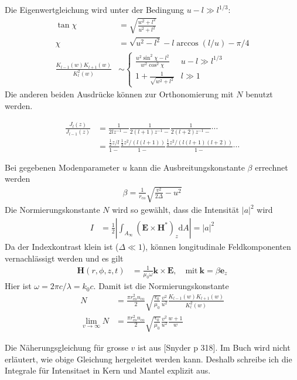 \documentclass{article}
\newcommand{\vect}[1]{\mathbf{#1}}
\def\k{\vect k}
\def\e{\vect e}
\def\E{\vect E}
\def\H{\vect H}
\def\({\left(}
\def\){\right)}
\newcommand{\nco}{n_\textrm{co}}
\newcommand{\rco}{r_\textrm{co}}
\begin{document}
Die Eigenwertgleichung wird unter der Bedingung $u-l\gg l^{1/3}$:
\begin{align}
  \tan\chi &= \sqrt{\frac{w^2+l^2}{u^2+l^2}}\\
  \chi &= \sqrt{u^2-l^2}-l\arccos(l/u)-\pi/4\\
  \frac{K_{l-1}(w)K_{l+1}(w)}{K_l^2(w)} &\sim \begin{cases}
    \frac{u^2 \sin^2\chi - l^2}{w^2 \cos^2\chi}&  u-l\gg l^{1/3}\\
   1+\frac{1}{\sqrt{w^2+l^2}} & l\gg 1
\end{cases}
\end{align}
Die anderen beiden Ausdr\"ucke k\"onnen zur Orthonomierung mit $N$
benutzt werden.

\begin{align}
  \frac{J_l(z)}{J_{l-1}(z)} &= \frac{1}{2lz^{-1}-} \frac{1}{2(l+1)z^{-1}-} \frac{1}{2(l+2)z^{-1} -}\cdots \\
  &= \frac{\frac{1}{2}z/l}{1-} \frac{\frac{1}{4}z^2/(l(l+1))}{1-} \frac{\frac{1}{4}z^2/(l(l+1)(l+2))}{1-} \cdots
\end{align}


Bei gegebenen Modenparameter $u$ kann die Ausbreitungskonstante
$\beta$ errechnet werden
\begin{align}
\beta = \frac{1}{\rco} \sqrt{\frac{v^2}{2\Delta} - u^2}
\end{align}
Die Normierungskonstante $N$ wird so gew\"ahlt, dass die Intensit\"at
$|a|^2$ wird
\begin{align}
  I &= \frac{1}{2}\left|\int_{A_\infty}\!\!\!\!\! \(\E\times\H^*\)_z  \textrm{d}A \right| = |a|^2
\end{align}
Da der Indexkontrast klein ist ($\Delta \ll 1$), k\"onnen longitudinale Feldkomponenten vernachl\"assigt werden und es gilt
\begin{align}
  \H(r,\phi,z,t) &= \frac{1}{\mu_0 \omega} \k \times \E, \quad\textrm{mit}\ \k = \beta \e_z
\end{align}
Hier ist $\omega=2\pi c/\lambda=k_0c$.
Damit ist die Normierungskonstante 
\begin{align}
  N &= \frac{\pi \rco^2 \nco}{2} \sqrt{\frac{\epsilon_0}{\mu_0}} \frac{v^2}{u^2} \frac{K_{l-1}(w)K_{l+1}(w)}{K_l^2(w)}\\
  \lim_{v\rightarrow\infty} N &= \frac{\pi \rco^2 \nco}{2} \sqrt{\frac{\epsilon_0}{\mu_0}} \frac{v^2}{u^2} \frac{w+1}{w}
\end{align}

Die N\"aherungsgleichung f\"ur grosse $v$ ist aus [Snyder p 318]. Im
Buch wird nicht erl\"autert, wie obige Gleichung hergeleitet werden
kann. Deshalb schreibe ich die Integrale f\"ur Intensitaet in Kern und
Mantel explizit aus.
\end{document}
